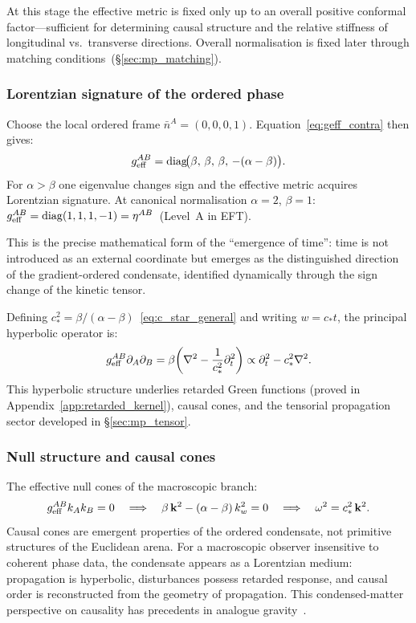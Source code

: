 At this stage the effective metric is fixed only up to an overall
positive conformal factor—sufficient for determining causal structure
and the relative stiffness of longitudinal vs.\ transverse directions.
Overall normalisation is fixed later through matching
conditions~(\S\ref{sec:mp_matching}).

\subsubsection*{Lorentzian signature of the ordered phase}

Choose the local ordered frame $\bar{n}^A=(0,0,0,1)$.
Equation~\eqref{eq:geff_contra} then gives:
\begin{equation}
  \label{eq:geff_diag}
  g_{\rm eff}^{AB}
  = \operatorname{diag}\!\bigl(\beta,\,\beta,\,\beta,\,-(\alpha-\beta)\bigr).
\end{equation}
For $\alpha>\beta$ one eigenvalue changes sign and the effective metric
acquires Lorentzian signature.
At canonical normalisation $\alpha=2$, $\beta=1$:
$g_{\rm eff}^{AB}=\operatorname{diag}(1,1,1,-1)=\eta^{AB}$~(Level~A in EFT).

This is the precise mathematical form of the ``emergence of time'':
time is not introduced as an external coordinate but emerges as the
distinguished direction of the gradient-ordered condensate, identified
dynamically through the sign change of the kinetic tensor.

Defining $c_*^2=\beta/(\alpha-\beta)$~\eqref{eq:c_star_general} and
writing $w=c_*t$, the principal hyperbolic operator is:
\begin{equation}
  \label{eq:principal_op}
  g_{\rm eff}^{AB}\partial_A\partial_B
  = \beta\!\left(\nabla^2-\frac{1}{c_*^2}\partial_t^2\right)
  \propto \partial_t^2-c_*^2\nabla^2.
\end{equation}
This hyperbolic structure underlies retarded Green functions
(proved in Appendix~\ref{app:retarded_kernel}), causal cones, and
the tensorial propagation sector developed in \S\ref{sec:mp_tensor}.

\subsubsection*{Null structure and causal cones}

The effective null cones of the macroscopic branch:
\begin{equation}
  \label{eq:null_condition}
  g_{\rm eff}^{AB}k_Ak_B=0
  \quad\Longrightarrow\quad
  \beta\,\mathbf{k}^2-(\alpha-\beta)\,k_w^2=0
  \quad\Longrightarrow\quad
  \omega^2=c_*^2\,\mathbf{k}^2.
\end{equation}
Causal cones are emergent properties of the ordered condensate, not
primitive structures of the Euclidean arena.
For a macroscopic observer insensitive to coherent phase data,
the condensate appears as a Lorentzian medium: propagation is
hyperbolic, disturbances possess retarded response, and causal order
is reconstructed from the geometry of propagation.
This condensed-matter perspective on causality has precedents in
analogue gravity~\cite{Unruh1981,Volovik2003}.

